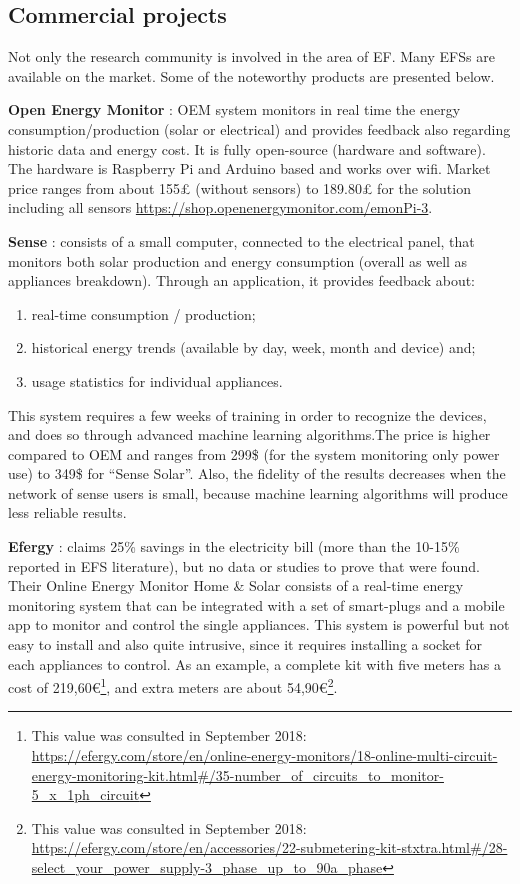 \subsection{Commercial projects}

Not only the research community is involved in the area of \ac{EF}. Many \acp{EFS} are available on the market. Some of the noteworthy products are presented below.



\textbf{Open Energy Monitor} \cite{HomeEnergy}: \ac{OEM} system monitors in real time the energy consumption/production (solar or electrical) and provides feedback also regarding historic data and energy cost. It is fully open-source (hardware and software). The hardware is Raspberry Pi and Arduino based and works over wifi. Market price ranges from about 155£ (without sensors) to 189.80£   for the solution including all sensors \url{https://shop.openenergymonitor.com/emonPi-3}.


\textbf{Sense} \cite{sense}: consists of a small computer, connected to the electrical panel, that monitors both solar production and energy consumption (overall as well as appliances breakdown). Through an application, it provides feedback about: 
\begin{enumerate}
    \item real-time consumption / production; 
    \item historical energy trends (available by day, week, month and device) and; 
    \item usage statistics for individual appliances.
\end{enumerate}

 This system requires a few weeks of training in order to recognize the devices, and does so through advanced machine learning algorithms.The price is higher compared to \ac{OEM} and ranges from 299\$ (for the system monitoring only power use) to 349\$ for “Sense Solar”. Also, the fidelity of the results decreases when the network of sense users is small, because machine learning algorithms will produce less reliable results.



\textbf{Efergy} \cite{efergy}:
claims 25\% savings in the electricity bill (more than the 10-15\% reported in \ac{EFS} literature), but no data or studies to prove that were found. Their Online Energy Monitor Home \& Solar consists of a real-time energy monitoring system that can be integrated with a set of smart-plugs and a mobile app to monitor and control the single appliances. This system is powerful but not easy to install and also quite intrusive, since it requires installing a socket for each appliances to control. As an example, a complete kit with five meters has a cost of 219,60€\footnote{This value was consulted in September 2018: \url{https://efergy.com/store/en/online-energy-monitors/18-online-multi-circuit-energy-monitoring-kit.html\#/35-number_of_circuits_to_monitor-5_x_1ph_circuit}}, and extra meters are about 54,90€\footnote{This value was consulted in September 2018: \url{https://efergy.com/store/en/accessories/22-submetering-kit-stxtra.html\#/28-select_your_power_supply-3_phase_up_to_90a_phase}}.



